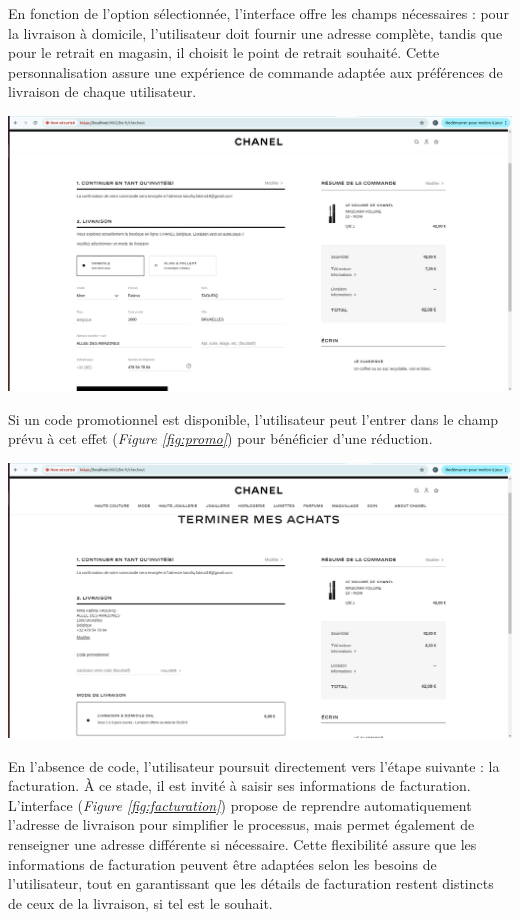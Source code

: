 En fonction de l'option sélectionnée, l'interface offre les champs nécessaires : pour la livraison à domicile, l'utilisateur doit fournir une adresse complète, tandis que pour le retrait en magasin, il choisit le point de retrait souhaité. Cette personnalisation assure une expérience de commande adaptée aux préférences de livraison de chaque utilisateur.
\begin{center}
    \centering
    \includegraphics[width=19cm]{Figures/Screens/Infos livraison.png}
    \label{fig:mode}
\end{center}
Si un code promotionnel est disponible, l'utilisateur peut l'entrer dans le champ prévu à cet effet (\textit{Figure \ref{fig:promo}}) pour bénéficier d'une réduction. 
\begin{center}
    \centering
    \includegraphics[width=19cm]{Figures/Screens/code prommo.png}
    \label{fig:promo}
\end{center}
En l'absence de code, l'utilisateur poursuit directement vers l'étape suivante : la facturation. À ce stade, il est invité à saisir ses informations de facturation. L'interface (\textit{Figure \ref{fig:facturation}}) propose de reprendre automatiquement l'adresse de livraison pour simplifier le processus, mais permet également de renseigner une adresse différente si nécessaire. Cette flexibilité assure que les informations de facturation peuvent être adaptées selon les besoins de l'utilisateur, tout en garantissant que les détails de facturation restent distincts de ceux de la livraison, si tel est le souhait.
